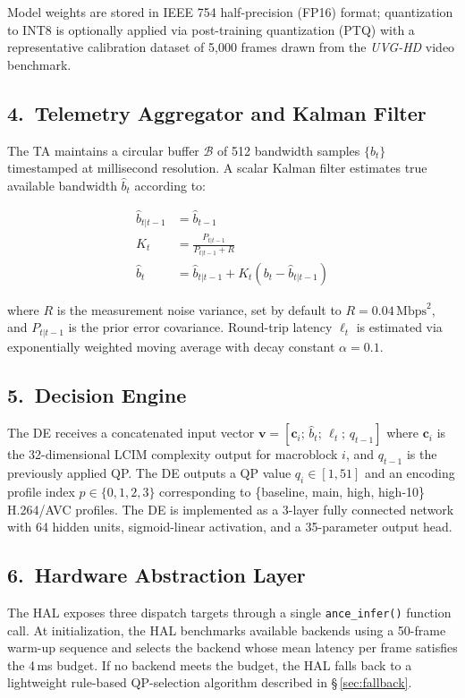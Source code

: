 \documentclass[12pt,letterpaper]{article}
\newcommand{\secref}[1]{\S\,\ref{#1}}
\begin{document}
Model weights are stored in IEEE 754 half-precision (FP16) format; quantization to
INT8 is optionally applied via post-training quantization (PTQ) with a representative
calibration dataset of 5,000 frames drawn from the \textit{UVG-HD} video benchmark.

\subsection{4.~Telemetry Aggregator and Kalman Filter}

The TA maintains a circular buffer $\mathcal{B}$ of 512 bandwidth samples
$\{b_t\}$ timestamped at millisecond resolution. A scalar Kalman filter
estimates true available bandwidth $\hat{b}_t$ according to:

\begin{align}
  \hat{b}_{t|t-1} &= \hat{b}_{t-1} \\[2pt]
  K_t             &= \frac{P_{t|t-1}}{P_{t|t-1} + R} \\[2pt]
  \hat{b}_t       &= \hat{b}_{t|t-1} + K_t\!\left(b_t - \hat{b}_{t|t-1}\right)
\end{align}

where $R$ is the measurement noise variance, set by default to
$R = 0.04\,\text{Mbps}^2$, and $P_{t|t-1}$ is the prior error covariance.
Round-trip latency $\ell_t$ is estimated via exponentially weighted moving average
with decay constant $\alpha = 0.1$.

\subsection{5.~Decision Engine}

The DE receives a concatenated input vector
$\mathbf{v} = [\mathbf{c}_i;\, \hat{b}_t;\, \ell_t;\, q_{t-1}]$
where $\mathbf{c}_i$ is the 32-dimensional LCIM complexity output for macroblock $i$,
and $q_{t-1}$ is the previously applied QP. The DE outputs a QP value
$q_i \in [1, 51]$ and an encoding profile index $p \in \{0, 1, 2, 3\}$
corresponding to \{baseline, main, high, high-10\} H.264/AVC profiles.
The DE is implemented as a 3-layer fully connected network with 64 hidden units,
sigmoid-linear activation, and a 35-parameter output head.

\subsection{6.~Hardware Abstraction Layer}

The HAL exposes three dispatch targets through a single \texttt{ance\_infer()}
function call. At initialization, the HAL benchmarks available backends using
a 50-frame warm-up sequence and selects the backend whose mean latency per frame
satisfies the 4\,ms budget. If no backend meets the budget, the HAL falls back to
a lightweight rule-based QP-selection algorithm described in \secref{sec:fallback}.
\end{document}
